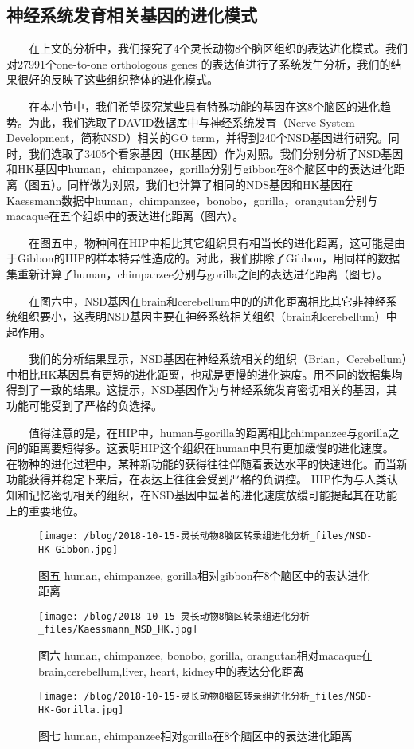 \documentclass[hyperref,]{ctexart}
\begin{document}
\subsection{神经系统发育相关基因的进化模式}

  在上文的分析中，我们探究了4个灵长动物8个脑区组织的表达进化模式。我们对27991个one-to-one
orthologous genes
的表达值进行了系统发生分析，我们的结果很好的反映了这些组织整体的进化模式。

  在本小节中，我们希望探究某些具有特殊功能的基因在这8个脑区的进化趋势。为此，我们选取了DAVID数据库中与神经系统发育（Nerve
System Development，简称NSD）相关的GO
term，并得到240个NSD基因进行研究。同时，我们选取了3405个看家基因（HK基因）作为对照。我们分别分析了NSD基因和HK基因中human，chimpanzee，gorilla分别与gibbon在8个脑区中的表达进化距离（图五）。同样做为对照，我们也计算了相同的NDS基因和HK基因在Kaessmann数据中human，chimpanzee，bonobo，gorilla，orangutan分别与macaque在五个组织中的表达进化距离（图六）。

  在图五中，物种间在HIP中相比其它组织具有相当长的进化距离，这可能是由于Gibbon的HIP的样本特异性造成的。对此，我们排除了Gibbon，用同样的数据集重新计算了human，chimpanzee分别与gorilla之间的表达进化距离（图七）。

  在图六中，NSD基因在brain和cerebellum中的的进化距离相比其它非神经系统组织要小，这表明NSD基因主要在神经系统相关组织（brain和cerebellum）中起作用。

  我们的分析结果显示，NSD基因在神经系统相关的组织（Brian，Cerebellum）中相比HK基因具有更短的进化距离，也就是更慢的进化速度。用不同的数据集均得到了一致的结果。这提示，NSD基因作为与神经系统发育密切相关的基因，其功能可能受到了严格的负选择。

  值得注意的是，在HIP中，human与gorilla的距离相比chimpanzee与gorilla之间的距离要短得多。这表明HIP这个组织在human中具有更加缓慢的进化速度。
在物种的进化过程中，某种新功能的获得往往伴随着表达水平的快速进化。而当新功能获得并稳定下来后，在表达上往往会受到严格的负调控。
HIP作为与人类认知和记忆密切相关的组织，在NSD基因中显著的进化速度放缓可能提起其在功能上的重要地位。

\begin{figure}
\centering
\texttt{[image: /blog/2018-10-15-灵长动物8脑区转录组进化分析\_files/NSD-HK-Gibbon.jpg]}
\caption{图五 human, chimpanzee,
gorilla相对gibbon在8个脑区中的表达进化距离}
\end{figure}

\begin{figure}
\centering
\texttt{[image: /blog/2018-10-15-灵长动物8脑区转录组进化分析\_files/Kaessmann\_NSD\_HK.jpg]}
\caption{图六 human, chimpanzee, bonobo, gorilla,
orangutan相对macaque在brain,cerebellum,liver, heart,
kidney中的表达分化距离}
\end{figure}

\begin{figure}
\centering
\texttt{[image: /blog/2018-10-15-灵长动物8脑区转录组进化分析\_files/NSD-HK-Gorilla.jpg]}
\caption{图七 human, chimpanzee相对gorilla在8个脑区中的表达进化距离}
\end{figure}
\end{document}
